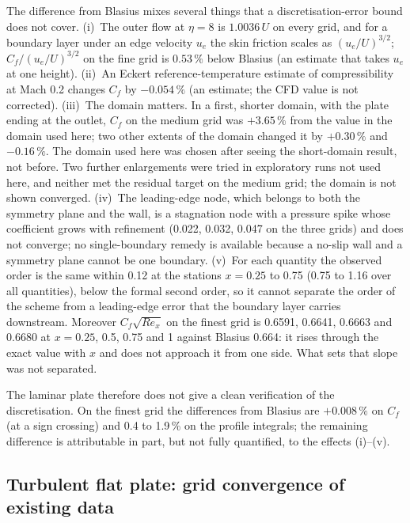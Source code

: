 \documentclass[11pt,a4paper]{article}
\begin{document}
The difference from Blasius mixes several things that a discretisation-error bound does not cover.
(i)~The outer flow at $\eta=8$ is $1.0036\,U$ on every grid, and for a boundary layer under an edge velocity
$u_e$ the skin friction scales as $(u_e/U)^{3/2}$; $C_f/(u_e/U)^{3/2}$ on the fine grid is $0.53\,\%$ below
Blasius (an estimate that takes $u_e$ at one height).
(ii)~An Eckert reference-temperature estimate of compressibility at Mach 0.2 changes $C_f$ by $-0.054\,\%$
(an estimate; the CFD value is not corrected).
(iii)~The domain matters.
In a first, shorter domain, with the plate ending at the outlet, $C_f$ on the medium grid was $+3.65\,\%$ from the
value in the domain used here; two other extents of the domain changed it by $+0.30\,\%$ and $-0.16\,\%$.
The domain used here was chosen after seeing the short-domain result, not before.
Two further enlargements were tried in exploratory runs not used here, and neither met the residual target on the
medium grid; the domain is not shown converged.
(iv)~The leading-edge node, which belongs to both the symmetry plane and the wall, is a stagnation node with a pressure spike whose
coefficient grows with refinement (0.022, 0.032, 0.047 on the three grids) and does not converge;
no single-boundary remedy is available because a no-slip wall and a symmetry plane cannot be one boundary.
(v)~For each quantity the observed order is the same within 0.12 at the stations $x=0.25$ to 0.75 (0.75 to 1.16 over
all quantities), below the formal second order, so it cannot separate the order of the scheme from a leading-edge error that the boundary
layer carries downstream.
Moreover $C_f\sqrt{Re_x}$ on the finest grid is 0.6591, 0.6641, 0.6663 and 0.6680 at $x=0.25$, 0.5, 0.75 and 1
against Blasius 0.664: it rises through the exact value with $x$ and does not approach it from one side.
What sets that slope was not separated.

The laminar plate therefore does not give a clean verification of the discretisation.
On the finest grid the differences from Blasius are $+0.008\,\%$ on $C_f$ (at a sign crossing) and 0.4 to 1.9\,\% on
the profile integrals; the remaining difference is attributable in part, but not fully quantified, to the effects
(i)--(v).

\subsection{Turbulent flat plate: grid convergence of existing data}
\label{sec:turbplate}
\end{document}
